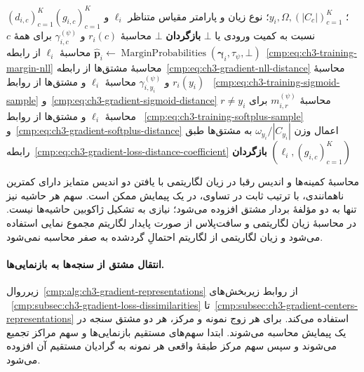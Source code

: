 \begin{algorithm}[!htbp]
\caption{زیرروال $\operatorname{LossSensitivity}$: زیان و مشتق نسبت به ناهمانندی‌ها}
\label{cmp:alg:ch3-gradient-loss-sensitivity}
\begin{algorithmic}[1]
\REQUIRE $(d_{i,c})_{c=1}^{K}$؛ $y_i,\Omega,(|C_c|)_{c=1}^{K}$؛
نوع زیان و پارامتر مقیاس متناظر
\ENSURE $\ell_i$ و $(g_{i,c})_{c=1}^{K}$ نسبت به کمیت ورودی یا $\bot$
    \STATE \textbf{بازگردان} $\bot$
\ENDIF
{}
    \STATE محاسبهٔ $r_i(c)$ و $\gamma_{i,c}^{(\psi)}$ برای همهٔ $c$
    \STATE $\widehat{\boldsymbol p}_i\gets
    \operatorname{MarginProbabilities}(\boldsymbol\gamma_i,\tau_\psi,\bot)$
    \STATE محاسبهٔ $\ell_i$ از رابطه~\eqref{cmp:eq:ch3-training-margin-nll}
    \STATE محاسبهٔ مشتق‌ها از رابطه~\eqref{cmp:eq:ch3-gradient-nll-distance}
    \STATE محاسبهٔ $r_i(y_i)$ و $\gamma_{i,y_i}^{(\psi)}$
    \STATE محاسبهٔ $\ell_i$ و مشتق‌ها از روابط
    ~\eqref{cmp:eq:ch3-training-sigmoid-sample}
    و~\eqref{cmp:eq:ch3-gradient-sigmoid-distance}
\ELSE
    \STATE محاسبهٔ $m_{i,r}^{(\psi)}$ برای $r\ne y_i$
    \STATE محاسبهٔ $\ell_i$ و مشتق‌ها از روابط
    ~\eqref{cmp:eq:ch3-training-softplus-sample}
    و~\eqref{cmp:eq:ch3-gradient-softplus-distance}
\ENDIF
\STATE اعمال وزن $\omega_{y_i}/|C_{y_i}|$ به مشتق‌ها طبق
رابطه~\eqref{cmp:eq:ch3-gradient-loss-distance-coefficient}
\STATE \textbf{بازگردان} $(\ell_i,(g_{i,c})_{c=1}^{K})$
\end{algorithmic}
\end{algorithm}

محاسبهٔ کمینه‌ها و اندیس رقبا در زیان
لگاریتمی با یافتن دو اندیس متمایز دارای
کمترین ناهمانندی، با ترتیب ثابت در تساوی،
در یک پیمایش ممکن است. سهم هر حاشیه نیز
تنها به دو مؤلفهٔ بردار مشتق افزوده می‌شود؛
نیازی به تشکیل ژاکوبین حاشیه‌ها نیست.
در محاسبهٔ زیان لگاریتمی و سافت‌پلاس
از صورت پایدار لگاریتم مجموع نمایی
استفاده می‌شود و زیان لگاریتمی از لگاریتم
احتمالِ گرد‌شده به صفر محاسبه نمی‌شود.

\paragraph{انتقال مشتق از سنجه‌ها به بازنمایی‌ها.}
زیرروال~\ref{cmp:alg:ch3-gradient-representations}
از روابط زیربخش‌های
~\ref{cmp:subsec:ch3-gradient-loss-dissimilarities}
تا~\ref{cmp:subsec:ch3-gradient-centers-representations}
استفاده می‌کند. برای هر زوج نمونه و مرکز،
هر دو مشتق سنجه در یک پیمایش محاسبه
می‌شوند. ابتدا سهم‌های مستقیم بازنمایی‌ها
و سهم مراکز تجمیع می‌شوند و سپس سهم
مرکز طبقهٔ واقعی هر نمونه به گرادیان
مستقیم آن افزوده می‌شود.

